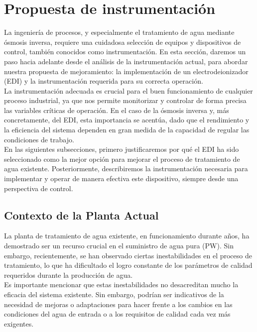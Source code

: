 \section{Propuesta de instrumentación}

La ingeniería de procesos, y especialmente el tratamiento de agua mediante ósmosis inversa, requiere una cuidadosa selección de equipos y dispositivos de control, también conocidos como instrumentación. En esta sección, daremos un paso hacia adelante desde el análisis de la instrumentación actual, para abordar nuestra propuesta de mejoramiento: la implementación de un electrodeionizador (EDI) y la instrumentación requerida para su correcta operación.\\

La instrumentación adecuada es crucial para el buen funcionamiento de cualquier proceso industrial, ya que nos permite monitorizar y controlar de forma precisa las variables críticas de operación. En el caso de la ósmosis inversa y, más concretamente, del EDI, esta importancia se acentúa, dado que el rendimiento y la eficiencia del sistema dependen en gran medida de la capacidad de regular las condiciones de trabajo.\\

En las siguientes subsecciones, primero justificaremos por qué el EDI ha sido seleccionado como la mejor opción para mejorar el proceso de tratamiento de agua existente. Posteriormente, describiremos la instrumentación necesaria para implementar y operar de manera efectiva este dispositivo, siempre desde una perspectiva de control.\\


\subsection{Contexto de la Planta Actual}

La planta de tratamiento de agua existente, en funcionamiento durante años, 
ha demostrado ser un recurso crucial en el suministro de agua pura (PW). 
Sin embargo, recientemente, se han observado ciertas inestabilidades en el 
proceso de tratamiento, lo que ha dificultado el logro constante de los parámetros 
de calidad requeridos durante la producción de agua.\\

Es importante mencionar que estas inestabilidades no desacreditan mucho la eficacia 
del sistema existente. Sin embargo, podrían ser indicativos de la necesidad 
de mejoras o adaptaciones para hacer frente a los cambios en las condiciones 
del agua de entrada o a los requisitos de calidad cada vez más exigentes.\\

